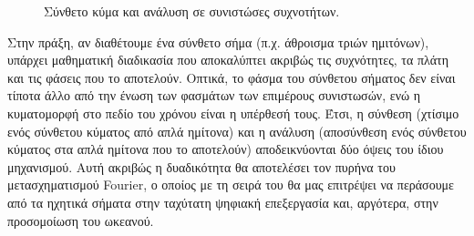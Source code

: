 \documentclass[a4paper, 11pt]{article}
\begin{document}
\begin{figure}[htbp]
\centering
\begin{minipage}{0.56\textwidth}
  \centering
\end{minipage}
\hfill
\begin{minipage}{0.40\textwidth}
  \centering
\end{minipage}
\caption{Σύνθετο κύμα και ανάλυση σε συνιστώσες συχνοτήτων.}
\label{fig:sound_spectrum_analysis}
\end{figure}

Στην πράξη, αν διαθέτουμε ένα σύνθετο σήμα (π.χ. άθροισμα τριών
ημιτόνων), υπάρχει μαθηματική διαδικασία που αποκαλύπτει ακριβώς τις
συχνότητες, τα πλάτη και τις φάσεις που το αποτελούν. Οπτικά, το φάσμα
του σύνθετου σήματος δεν είναι τίποτα άλλο από την ένωση των φασμάτων
των επιμέρους συνιστωσών, ενώ η κυματομορφή στο πεδίο του χρόνου είναι η
υπέρθεσή τους. Έτσι, η σύνθεση (χτίσιμο ενός σύνθετου κύματος από απλά
ημίτονα) και η ανάλυση (αποσύνθεση ενός σύνθετου κύματος στα απλά
ημίτονα που το αποτελούν) αποδεικνύονται δύο όψεις του ίδιου μηχανισμού.
Αυτή ακριβώς η δυαδικότητα θα αποτελέσει τον πυρήνα του μετασχηματισμού
Fourier, ο οποίος με τη σειρά του θα μας επιτρέψει να περάσουμε από τα
ηχητικά σήματα στην ταχύτατη ψηφιακή επεξεργασία και, αργότερα, στην
προσομοίωση του ωκεανού.
\end{document}
